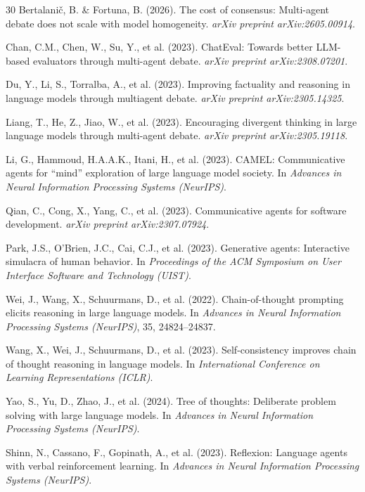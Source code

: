 \documentclass[12pt,a4paper,UTF8,fontset=fandol]{ctexart}
\begin{document}
\begin{thebibliography}{30}
Bertalani\v{c}, B. \& Fortuna, B. (2026). The cost of consensus: Multi-agent debate does not scale with model homogeneity. \textit{arXiv preprint arXiv:2605.00914}.

Chan, C.M., Chen, W., Su, Y., et al. (2023). ChatEval: Towards better LLM-based evaluators through multi-agent debate. \textit{arXiv preprint arXiv:2308.07201}.

Du, Y., Li, S., Torralba, A., et al. (2023). Improving factuality and reasoning in language models through multiagent debate. \textit{arXiv preprint arXiv:2305.14325}.

Liang, T., He, Z., Jiao, W., et al. (2023). Encouraging divergent thinking in large language models through multi-agent debate. \textit{arXiv preprint arXiv:2305.19118}.

Li, G., Hammoud, H.A.A.K., Itani, H., et al. (2023). CAMEL: Communicative agents for ``mind'' exploration of large language model society. In \textit{Advances in Neural Information Processing Systems (NeurIPS)}.

Qian, C., Cong, X., Yang, C., et al. (2023). Communicative agents for software development. \textit{arXiv preprint arXiv:2307.07924}.

Park, J.S., O'Brien, J.C., Cai, C.J., et al. (2023). Generative agents: Interactive simulacra of human behavior. In \textit{Proceedings of the ACM Symposium on User Interface Software and Technology (UIST)}.

Wei, J., Wang, X., Schuurmans, D., et al. (2022). Chain-of-thought prompting elicits reasoning in large language models. In \textit{Advances in Neural Information Processing Systems (NeurIPS)}, 35, 24824--24837.

Wang, X., Wei, J., Schuurmans, D., et al. (2023). Self-consistency improves chain of thought reasoning in language models. In \textit{International Conference on Learning Representations (ICLR)}.

Yao, S., Yu, D., Zhao, J., et al. (2024). Tree of thoughts: Deliberate problem solving with large language models. In \textit{Advances in Neural Information Processing Systems (NeurIPS)}.

Shinn, N., Cassano, F., Gopinath, A., et al. (2023). Reflexion: Language agents with verbal reinforcement learning. In \textit{Advances in Neural Information Processing Systems (NeurIPS)}.


\end{thebibliography}
\end{document}
